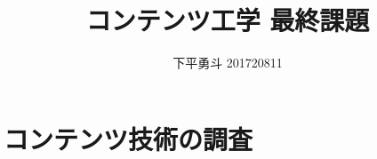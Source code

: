 \documentclass[11pt,a4paper,uplatex]{jsarticle}
\title{コンテンツ工学 最終課題}
\author{下平勇斗 201720811}
\date{}
\begin{document}
\maketitle
\section*{コンテンツ技術の調査}


\begin{thebibliography}{100}

\end{thebibliography}
\end{document}
